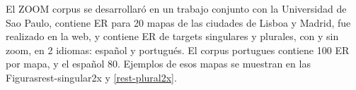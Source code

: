\label{sec:corpusZOOM}
El ZOOM corpus se desarrollar\'o en un trabajo conjunto con la Universidad de Sao Paulo, contiene ER para 20 mapas de las ciudades de Lisboa y Madrid, fue realizado en la web, y contiene ER de targets singulares y plurales, con y sin zoom, en 2 idiomas: espa\~nol y portugu\'es. El corpus portugues contiene 100 ER por mapa, y el espa\~nol 80. Ejemplos de esos mapas se muestran en las Figuras{rest-singular2x} y \ref{rest-plural2x}.


